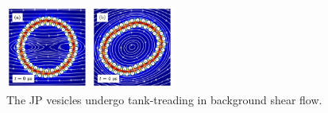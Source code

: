 %
%
\begin{figure}
\includegraphics[width=0.5\textwidth]{figures/TankTreading.jpg}
\caption{\label{fig:JPv_linearshear}The JP vesicles undergo tank-treading in background shear flow.}
\end{figure}
